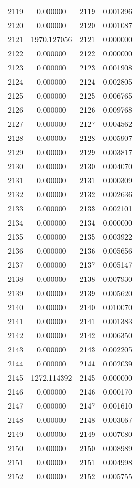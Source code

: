 \documentclass[12pt]{article}
\begin{document}
\begin{longtable}{@{}cccc@{}}
2119 & 0.000000 & 2119 & 0.001396 \\
2120 & 0.000000 & 2120 & 0.001087 \\
2121 & 1970.127056 & 2121 & 0.000000 \\
2122 & 0.000000 & 2122 & 0.000000 \\
2123 & 0.000000 & 2123 & 0.001908 \\
2124 & 0.000000 & 2124 & 0.002805 \\
2125 & 0.000000 & 2125 & 0.006765 \\
2126 & 0.000000 & 2126 & 0.009768 \\
2127 & 0.000000 & 2127 & 0.004562 \\
2128 & 0.000000 & 2128 & 0.005907 \\
2129 & 0.000000 & 2129 & 0.003817 \\
2130 & 0.000000 & 2130 & 0.004070 \\
2131 & 0.000000 & 2131 & 0.000309 \\
2132 & 0.000000 & 2132 & 0.002636 \\
2133 & 0.000000 & 2133 & 0.002101 \\
2134 & 0.000000 & 2134 & 0.000000 \\
2135 & 0.000000 & 2135 & 0.003922 \\
2136 & 0.000000 & 2136 & 0.005656 \\
2137 & 0.000000 & 2137 & 0.005147 \\
2138 & 0.000000 & 2138 & 0.007930 \\
2139 & 0.000000 & 2139 & 0.005620 \\
2140 & 0.000000 & 2140 & 0.010070 \\
2141 & 0.000000 & 2141 & 0.001383 \\
2142 & 0.000000 & 2142 & 0.006350 \\
2143 & 0.000000 & 2143 & 0.002205 \\
2144 & 0.000000 & 2144 & 0.002039 \\
2145 & 1272.114392 & 2145 & 0.000000 \\
2146 & 0.000000 & 2146 & 0.000170 \\
2147 & 0.000000 & 2147 & 0.001610 \\
2148 & 0.000000 & 2148 & 0.003067 \\
2149 & 0.000000 & 2149 & 0.007080 \\
2150 & 0.000000 & 2150 & 0.008989 \\
2151 & 0.000000 & 2151 & 0.004998 \\
2152 & 0.000000 & 2152 & 0.005755 \\

\end{longtable}
\end{document}
